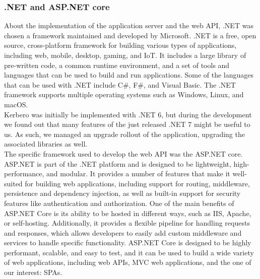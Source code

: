 \subsubsection{.NET and ASP.NET core}
About the implementation of the application server and the web API, .NET was chosen a framework maintained and developed by Microsoft. .NET is a free, open source, cross-platform framework for building various types of applications, including web, mobile, desktop, gaming, and IoT. It includes a large library of pre-written code, a common runtime environment, and a set of tools and languages that can be used to build and run applications. Some of the languages that can be used with .NET include C\#, F\#, and Visual Basic. The .NET framework supports multiple operating systems such as Windows, Linux, and macOS. 
\\ Kerbero was initially be implemented with .NET 6, but during the development we found out that many features of the just released .NET 7 might be useful to us. As such, we managed an upgrade rollout of the application, upgrading the associated libraries as well.
\\ The specific framework used to develop the web API was the ASP.NET core. ASP.NET is part of the .NET platform and is designed to be lightweight, high-performance, and modular. It provides a number of features that make it well-suited for building web applications, including support for routing, middleware, persistence and dependency injection, as well as built-in support for security features like authentication and authorization. One of the main benefits of ASP.NET Core is its ability to be hosted in different ways, such as IIS, Apache, or self-hosting. Additionally, it provides a flexible pipeline for handling requests and responses, which allows developers to easily add custom middleware and services to handle specific functionality. ASP.NET Core is designed to be highly performant, scalable, and easy to test, and it can be used to build a wide variety of web applications, including web APIs, MVC web applications, and the one of our interest: SPAs.

